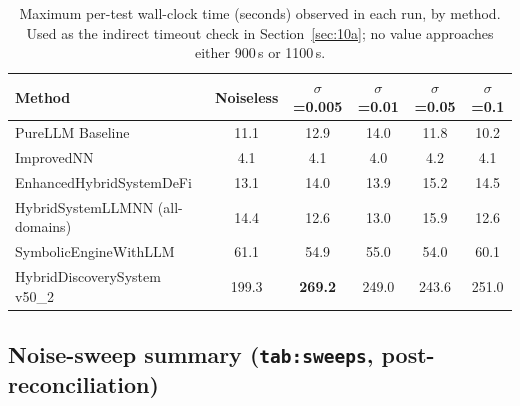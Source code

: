\documentclass[11pt]{article}
\begin{document}
\begin{table}[h]
\centering
\caption{Maximum per-test wall-clock time (seconds) observed in each run,
by method. Used as the indirect timeout check in Section~\ref{sec:10a};
no value approaches either 900\,s or 1100\,s.}
\label{tab:times}
\small
\begin{tabular}{@{}lccccc@{}}
\toprule
\textbf{Method} & \textbf{Noiseless} & \textbf{$\sigma$=0.005} & \textbf{$\sigma$=0.01} & \textbf{$\sigma$=0.05} & \textbf{$\sigma$=0.1} \\
\midrule
PureLLM Baseline           & 11.1 & 12.9 & 14.0 & 11.8 & 10.2 \\
ImprovedNN                 &  4.1 &  4.1 &  4.0 &  4.2 &  4.1 \\
EnhancedHybridSystemDeFi   & 13.1 & 14.0 & 13.9 & 15.2 & 14.5 \\
HybridSystemLLMNN (all-domains) & 14.4 & 12.6 & 13.0 & 15.9 & 12.6 \\
SymbolicEngineWithLLM      & 61.1 & 54.9 & 55.0 & 54.0 & 60.1 \\
HybridDiscoverySystem v50\_2 & 199.3 & \textbf{269.2} & 249.0 & 243.6 & 251.0 \\
\bottomrule
\end{tabular}
\end{table}

\subsection{Noise-sweep summary (\texttt{tab:sweeps}, post-reconciliation)}
\end{document}
